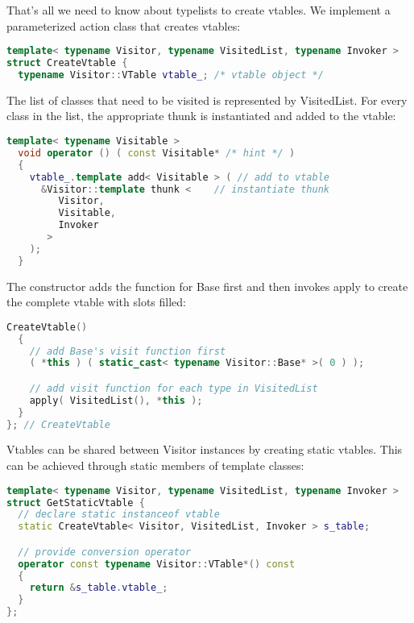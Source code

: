 \documentclass{book}
\begin{document}
That's all we need to know about typelists to create vtables. We implement a parameterized action class that creates vtables:

\begin{lstlisting}[caption={visitor pattern sample code 5, commandexample.cpp},language=C++]
template< typename Visitor, typename VisitedList, typename Invoker >
struct CreateVtable {
  typename Visitor::VTable vtable_; /* vtable object */
\end{lstlisting}

The list of classes that need to be visited is represented by VisitedList. For every class in the list, the appropriate thunk is instantiated and added to the vtable:

\begin{lstlisting}[caption={visitor pattern sample code 5, commandexample.cpp},language=C++]
  template< typename Visitable >
  void operator () ( const Visitable* /* hint */ )
  {
    vtable_.template add< Visitable > ( // add to vtable
      &Visitor::template thunk <    // instantiate thunk
         Visitor,
         Visitable,
         Invoker
       >
    );
  }
\end{lstlisting}

The constructor adds the function for Base first and then invokes apply to create the complete vtable with slots filled:

\begin{lstlisting}[caption={visitor pattern sample code 5, commandexample.cpp},language=C++]
  CreateVtable()
  {
    // add Base's visit function first
    ( *this ) ( static_cast< typename Visitor::Base* >( 0 ) );

    // add visit function for each type in VisitedList
    apply( VisitedList(), *this );
  }
}; // CreateVtable
\end{lstlisting}

Vtables can be shared between Visitor instances by creating static vtables. This can be achieved through static members of template classes:

\begin{lstlisting}[caption={visitor pattern sample code 5, commandexample.cpp},language=C++]
template< typename Visitor, typename VisitedList, typename Invoker >
struct GetStaticVtable {
  // declare static instanceof vtable
  static CreateVtable< Visitor, VisitedList, Invoker > s_table;

  // provide conversion operator
  operator const typename Visitor::VTable*() const
  {
    return &s_table.vtable_; 
  }
};
\end{lstlisting}
\end{document}
